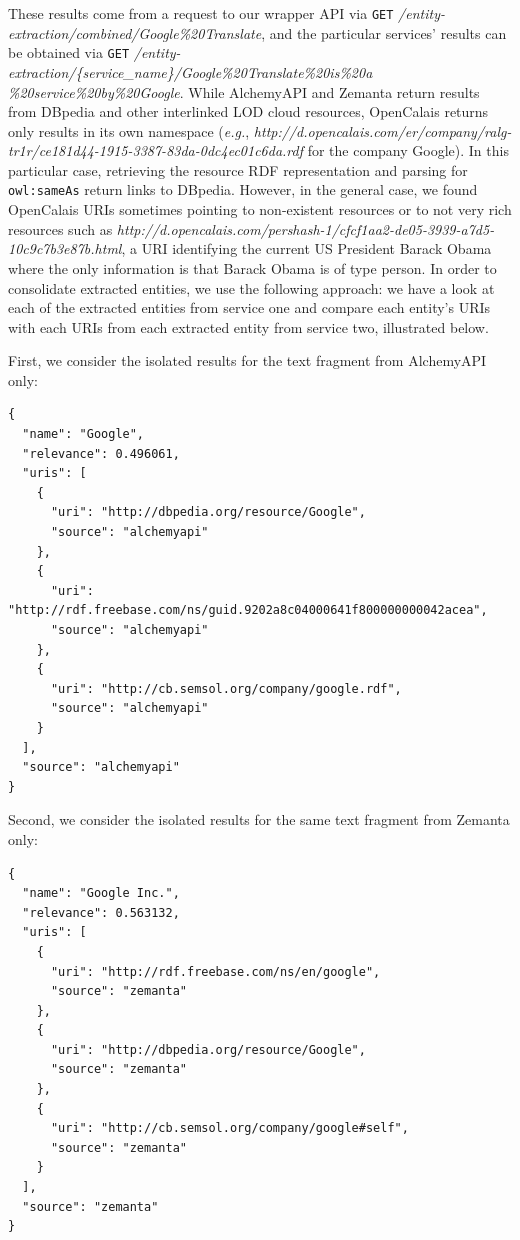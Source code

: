 These results come from a request to our wrapper API via \texttt{GET} \textit{/entity-extraction/combined/Google\%20Translate},
and the particular services' results can be obtained via \texttt{GET} \textit{/entity-extraction/\{service\_name\}/Google\%20Translate\%20is\%20a\\\%20service\%20by\%20Google}.
While AlchemyAPI and Zemanta return results from DBpedia and other interlinked LOD cloud resources, OpenCalais returns
only results in its own namespace
(\emph{e.g.}, \textit{http://d.opencalais.com/er/company/ralg-tr1r/ce181d44-1915-3387-83da-0dc4ec01c6da.rdf} for the
company Google). In this particular case, retrieving the resource RDF representation and parsing for
\texttt{owl:sameAs} return links to DBpedia. However, in the general case, we found OpenCalais URIs sometimes pointing
to non-existent resources or to not very rich resources such
as \textit{http://d.opencalais.com/pershash-1/cfcf1aa2-de05-3939-a7d5-10c9c7b3e87b.html}, a URI identifying
the current US President Barack Obama where the only information is that Barack Obama is of type person. In order to
consolidate extracted entities, we use the following approach: we have a look at each of the extracted entities from
service one and compare each entity's URIs with each URIs from each extracted entity from service two, illustrated below.

First, we consider the isolated results for the text fragment from AlchemyAPI only:

\begin{lstlisting}
{
  "name": "Google",
  "relevance": 0.496061,
  "uris": [
    {
      "uri": "http://dbpedia.org/resource/Google",
      "source": "alchemyapi"
    },
    {
      "uri": "http://rdf.freebase.com/ns/guid.9202a8c04000641f800000000042acea",
      "source": "alchemyapi"
    },
    {
      "uri": "http://cb.semsol.org/company/google.rdf",
      "source": "alchemyapi"
    }
  ],
  "source": "alchemyapi"
}
\end{lstlisting}

Second, we consider the isolated results for the same text fragment from Zemanta only:

\begin{lstlisting}
{
  "name": "Google Inc.",
  "relevance": 0.563132,
  "uris": [
    {
      "uri": "http://rdf.freebase.com/ns/en/google",
      "source": "zemanta"
    },
    {
      "uri": "http://dbpedia.org/resource/Google",
      "source": "zemanta"
    },
    {
      "uri": "http://cb.semsol.org/company/google#self",
      "source": "zemanta"
    }
  ],
  "source": "zemanta"
}
\end{lstlisting}

